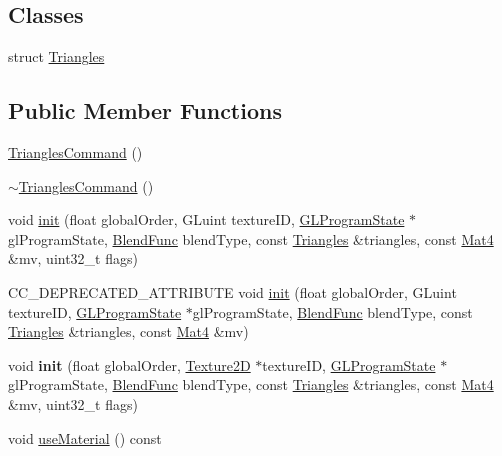 \subsection*{Classes}
\begin{DoxyCompactItemize}
\item 
struct \hyperlink{structTrianglesCommand_1_1Triangles}{Triangles}
\end{DoxyCompactItemize}
\subsection*{Public Member Functions}
\begin{DoxyCompactItemize}
\item 
\hyperlink{classTrianglesCommand_a1529fed49ad46597735bdc938e4fe9c4}{Triangles\+Command} ()
\item 
\hyperlink{classTrianglesCommand_a9d5615e7b768aa6c5687a8d196a4f54f}{$\sim$\+Triangles\+Command} ()
\item 
void \hyperlink{classTrianglesCommand_a3957f719246b9bb6e3f6ed68d9d124d0}{init} (float global\+Order, G\+Luint texture\+ID, \hyperlink{classGLProgramState}{G\+L\+Program\+State} $\ast$gl\+Program\+State, \hyperlink{structBlendFunc}{Blend\+Func} blend\+Type, const \hyperlink{structTrianglesCommand_1_1Triangles}{Triangles} \&triangles, const \hyperlink{classMat4}{Mat4} \&mv, uint32\+\_\+t flags)
\item 
C\+C\+\_\+\+D\+E\+P\+R\+E\+C\+A\+T\+E\+D\+\_\+\+A\+T\+T\+R\+I\+B\+U\+TE void \hyperlink{classTrianglesCommand_a8e2f2003c9713ce987827d8520454d18}{init} (float global\+Order, G\+Luint texture\+ID, \hyperlink{classGLProgramState}{G\+L\+Program\+State} $\ast$gl\+Program\+State, \hyperlink{structBlendFunc}{Blend\+Func} blend\+Type, const \hyperlink{structTrianglesCommand_1_1Triangles}{Triangles} \&triangles, const \hyperlink{classMat4}{Mat4} \&mv)
\item 
\mbox{\label{classTrianglesCommand_a7d87d28f74ae5779b47e33f1c7e6e2e2}} 
void {\bfseries init} (float global\+Order, \hyperlink{classTexture2D}{Texture2D} $\ast$texture\+ID, \hyperlink{classGLProgramState}{G\+L\+Program\+State} $\ast$gl\+Program\+State, \hyperlink{structBlendFunc}{Blend\+Func} blend\+Type, const \hyperlink{structTrianglesCommand_1_1Triangles}{Triangles} \&triangles, const \hyperlink{classMat4}{Mat4} \&mv, uint32\+\_\+t flags)
\item 
void \hyperlink{classTrianglesCommand_ad55143235c591c8387090eac066f9993}{use\+Material} () const

\end{DoxyCompactItemize}
